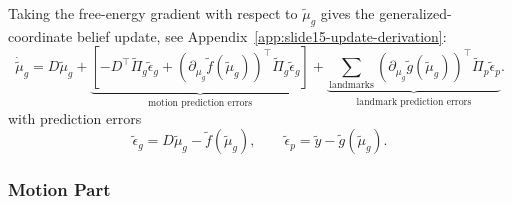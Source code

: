  Taking the free-energy gradient with respect to $\tilde{\mu}_{g}$ gives the generalized-coordinate belief update, see Appendix~\ref{app:slide15-update-derivation}:
\begin{equation}
    \dot{\tilde{\mu}}_{g}
    =
    D\tilde{\mu}_{g}
    +
    \underbrace{
        \left[
            -
            D^\top \tilde{\Pi}_{g}\tilde{\epsilon}_{g}
            +
            \left(
                \partial_{\mu_g}\tilde{f}(\tilde{\mu}_{g})
            \right)^\top
            \tilde{\Pi}_{g}\tilde{\epsilon}_{g}
        \right]
    }_{\text{motion prediction errors}}
    +
    \underbrace{
        \sum_{\mathrm{landmarks}}
        \left(
            \partial_{\mu_g}\tilde{g}(\tilde{\mu}_{g})
        \right)^\top
        \tilde{\Pi}_{p}\tilde{\epsilon}_{p}
    }_{\text{landmark prediction errors}}.
    \label{eq:slide15-generic-update}
\end{equation}
with prediction errors
\begin{equation}
    \tilde{\epsilon}_g
    =
    D\tilde{\mu}_g
    -
    \tilde{f}(\tilde{\mu}_g),
    \qquad
    \tilde{\epsilon}_p
    =
    \tilde{y}
    -
    \tilde{g}(\tilde{\mu}_g).
    \label{eq:prediction-errors}
\end{equation}

\subsubsection{Motion Part}
\label{subsec:gradient-motion}

